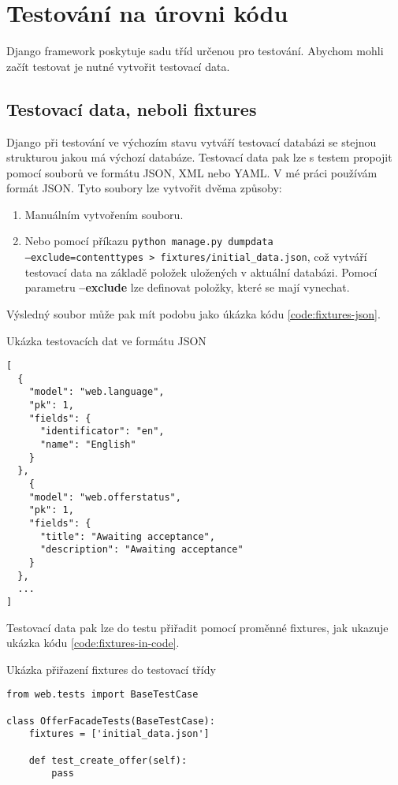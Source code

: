 \section{Testování na úrovni kódu}
Django framework poskytuje sadu tříd určenou pro testování. Abychom mohli začít testovat je nutné vytvořit testovací data.

\subsection{Testovací data, neboli fixtures}
Django při testování ve výchozím stavu vytváří testovací databázi se stejnou strukturou jakou má výchozí databáze. Testovací data pak lze s testem propojit pomocí souborů ve formátu JSON, XML nebo YAML. V mé práci používám formát JSON. Tyto soubory lze vytvořit dvěma způsoby:

\begin{enumerate}
    \item Manuálním vytvořením souboru.
    \item Nebo pomocí příkazu \texttt{python manage.py dumpdata \\--exclude=contenttypes > fixtures/initial\_data.json}, což vytváří testovací data na základě položek uložených v aktuální databázi. Pomocí parametru \textbf{--exclude} lze definovat položky, které se mají vynechat.
\end{enumerate}

Výsledný soubor může pak mít podobu jako úkázka kódu \ref{code:fixtures-json}.

\begin{listing}[h]
\caption{\label{code:fixtures-json}Ukázka testovacích dat ve formátu JSON}
\begin{verbatim}
[
  {
    "model": "web.language",
    "pk": 1,
    "fields": {
      "identificator": "en",
      "name": "English"
    }
  },
    {
    "model": "web.offerstatus",
    "pk": 1,
    "fields": {
      "title": "Awaiting acceptance",
      "description": "Awaiting acceptance"
    }
  },
  ...
]
\end{verbatim}
\end{listing}

Testovací data pak lze do testu přiřadit pomocí proměnné fixtures, jak ukazuje ukázka kódu \ref{code:fixtures-in-code}.

\begin{listing}[h]
\caption{\label{code:fixtures-in-code}Ukázka přiřazení fixtures do testovací třídy}
\begin{verbatim}
from web.tests import BaseTestCase

class OfferFacadeTests(BaseTestCase):
    fixtures = ['initial_data.json']

    def test_create_offer(self):
        pass
\end{verbatim}
\end{listing}

